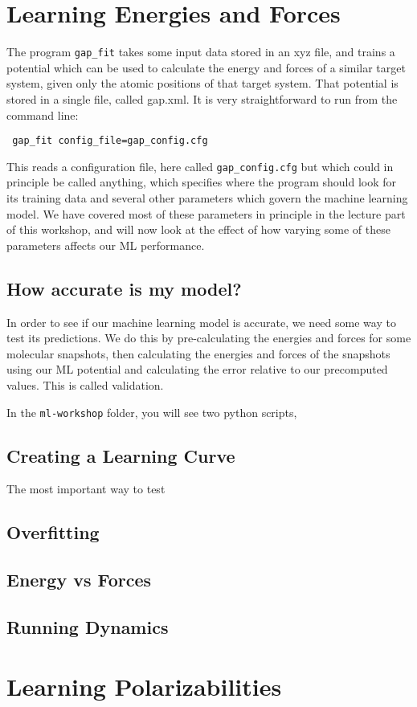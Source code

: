 \documentclass{article}
\begin{document}
\section{Learning Energies and Forces}

The program \verb|gap_fit| takes some input data stored in an xyz file, and trains a potential which can be used to calculate the energy and forces of a similar target system, given only the atomic positions of that target system. That potential is stored in a single file, called gap.xml. It is very straightforward to run from the command line:

\verb| gap_fit config_file=gap_config.cfg |

This reads a configuration file, here called \verb|gap_config.cfg| but which could in principle be called anything, which specifies where the program should look for its training data and several other parameters which govern the machine learning model. We have covered most of these parameters in principle in the lecture part of this workshop, and will now look at the effect of how varying some of these parameters affects our ML performance.

\subsection{How accurate is my model?}

In order to see if our machine learning model is accurate, we need some way to test its predictions. We do this by pre-calculating the energies and forces for some molecular snapshots, then calculating the energies and forces of the snapshots using our ML potential and calculating the error relative to our precomputed values. This is called validation. 

In the \verb|ml-workshop| folder, you will see two python scripts,

\subsection{Creating a Learning Curve}

The most important way to test

\subsection{Overfitting}

\subsection{Energy vs Forces}

\subsection{Running Dynamics}

\section{Learning Polarizabilities}
\end{document}
